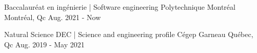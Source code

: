 

\begin{cventries}

  \cventry
    {Baccalauréat en ingénierie | Software engineering} %
    {Polytechnique Montréal} %
    {Montréal, Qc} %
    {Aug. 2021 - Now} %
    {}
  
  \cventry
    {Natural Science DEC | Science and engineering profile} %
    {Cégep Garneau} %
    {Québec, Qc} %
    {Aug. 2019 - May 2021} %
    {}
\end{cventries}
